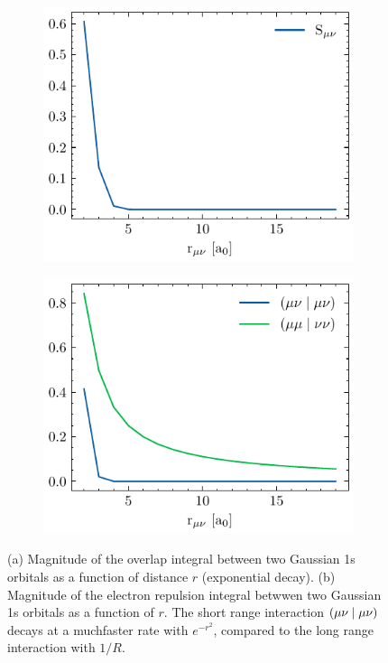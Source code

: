 \begin{figure}
\centering
\begin{subfigure}{0.45\linewidth}
\includegraphics[scale=0.8]{overlap_decay}
\caption{}
\end{subfigure}
\begin{subfigure}{0.45\linewidth}
\includegraphics[scale=0.8]{eri_decay}
\caption{}
\end{subfigure}%
\caption{(a) Magnitude of the overlap integral between two Gaussian 1s orbitals as a function of distance $r$ (exponential decay). (b) Magnitude of the electron repulsion integral betwwen two Gaussian 1s orbitals as a function of $r$. The short range interaction $\left( \mu\nu \mid \mu\nu \right)$ decays at a  muchfaster rate with $e^{-r^2}$, compared to the long range interaction with $1/R$.}
\end{figure}

